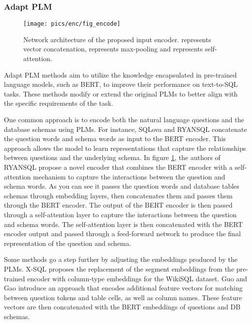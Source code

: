 \subsubsection{Adapt PLM} %
\label{sec:adaptplm}

\begin{figure}[H]
    \centering
    \texttt{[image: pics/enc/fig\_encode]}
    \caption{Network architecture of the proposed input encoder.  represents vector concatenation,  represents max-pooling and  represents self-attention.\cite{choi_ryansql_2020}}
    \label{fig:ryan}
\end{figure}

Adapt \ac{PLM} methods aim to utilize the knowledge encapsulated in pre-trained language models, such as BERT\cite{DBLP:journals/corr/abs-1810-04805}, to improve their performance on text-to-SQL tasks. These methods modify or extend the original PLMs to better align with the specific requirements of the task.

One common approach is to encode both the natural language questions and the database schemas using PLMs. For instance, SQLova\cite{DBLP:journals/corr/abs-1902-01069} and RYANSQL\cite{10.1162/coli_a_00403} concatenate the question words and schema words as input to the BERT encoder. This approach allows the model to learn representations that capture the relationships between questions and the underlying schema. In figure \ref{fig:ryan}, the authors of RYANSQL\cite{10.1162/coli_a_00403} propose a novel encoder that combines the BERT encoder with a self-attention mechanism to capture the interactions between the question and schema words. As you can see it passes the question words and database tables schemas through embedding layers, then concatenates them and passes them through the BERT encoder. The output of the BERT encoder is then passed through a self-attention layer to capture the interactions between the question and schema words. The self-attention layer is then concatenated with the BERT encoder output and passed through a feed-forward network to produce the final representation of the question and schema.

Some methods go a step further by adjusting the embeddings produced by the PLMs. X-SQL\cite{he2019xsql} proposes the replacement of the segment embeddings from the pre-trained encoder with column-type embeddings for the WikiSQL dataset. Guo and Gao \cite{guo2020content} introduce an approach that encodes additional feature vectors for matching between question tokens and table cells, as well as column names. These feature vectors are then concatenated with the BERT embeddings of questions and DB schemas.

